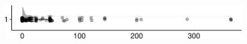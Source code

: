 \documentclass[
]{article}
\begin{document}
\begin{minipage}[t]{0.3\linewidth}

~

\end{minipage}%
\begin{minipage}[t]{0.7\linewidth}

\includegraphics[width=396px]{codebook_template_files/figure-latex/q7_29_rainplot-1}

\end{minipage}
 \vspace*{-5mm} 

\begin{minipage}[t]{0.3\linewidth}

~

\end{minipage}%
\begin{minipage}[t]{0.7\linewidth}

~

\end{minipage}
 \vspace*{-7mm} 
\end{document}
